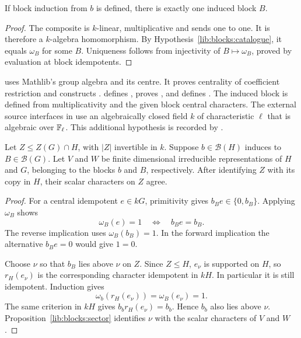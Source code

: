 \begin{proposition}
\label{lib:blocks:induced-block}
If block induction from $b$ is defined, there is exactly one induced
block $B$.
\end{proposition}
\begin{proof}
The composite is $k$-linear, multiplicative and sends one to one. It is
therefore a $k$-algebra homomorphism. By
Hypothesis~\ref{lib:blocks:catalogue}, it equals $\omega_B$ for some $B$.
Uniqueness follows from injectivity of
$B\mapsto\omega_B$, proved by evaluation at block idempotents.
\end{proof}

\begin{implementation}
 uses Mathlib's group algebra
and its centre. It proves centrality of coefficient restriction and
constructs .
 defines
, proves
, and defines .
The induced block is defined from multiplicativity and the given block
central characters.
The external source interfaces in
 use an algebraically closed
field $k$ of characteristic $\ell$ that is algebraic over $\mathbb F_\ell$.
This additional hypothesis is recorded by
.
\end{implementation}

\begin{proposition}
\label{lib:blocks:induction-sector}
Let $Z\leq Z(G)\cap H$, with $|Z|$ invertible in $k$.
Suppose $b\in\mathcal B(H)$ induces to $B\in\mathcal B(G)$.
Let $V$ and $W$ be finite dimensional irreducible representations of
$H$ and $G$, belonging to the blocks $b$ and $B$, respectively.
After identifying $Z$ with its copy in $H$, their scalar characters
on $Z$ agree.
\end{proposition}
\begin{proof}
For a central idempotent $e\in kG$, primitivity gives
$b_Be\in\{0,b_B\}$. Applying $\omega_B$ shows
\[
 \omega_B(e)=1\quad\Longleftrightarrow\quad b_Be=b_B.
\]
The reverse implication uses $\omega_B(b_B)=1$. In the forward
implication the alternative $b_Be=0$ would give $1=0$.

Choose $\nu$ so that $b_B$ lies above $\nu$ on $Z$. Since $Z\leq H$,
$e_\nu$ is supported on $H$, so $r_H(e_\nu)$ is the corresponding
character idempotent in
$kH$. In particular it is still idempotent. Induction gives
\[
 \omega_b(r_H(e_\nu))=\omega_B(e_\nu)=1.
\]
The same criterion in $kH$ gives
$b_b r_H(e_\nu)=b_b$. Hence $b_b$ also lies above $\nu$.
Proposition~\ref{lib:blocks:sector} identifies $\nu$ with
the scalar characters of $V$ and $W$.
\end{proof}

